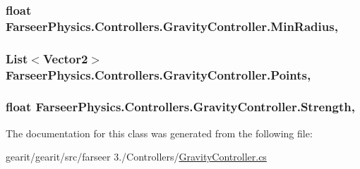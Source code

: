 \hypertarget{class_farseer_physics_1_1_controllers_1_1_gravity_controller_a62164441fdaa380f2fd9e265a9ba9fd7}{
\subsubsection[{Min\+Radius}]{\setlength{\rightskip}{0pt plus 5cm}float Farseer\+Physics.\+Controllers.\+Gravity\+Controller.\+Min\+Radius\hspace{0.3cm}{\ttfamily [get]}, {\ttfamily [set]}}}\label{class_farseer_physics_1_1_controllers_1_1_gravity_controller_a62164441fdaa380f2fd9e265a9ba9fd7}
\hypertarget{class_farseer_physics_1_1_controllers_1_1_gravity_controller_a9b05fca86103e44d8da49ab878a8d34a}{
\subsubsection[{Points}]{\setlength{\rightskip}{0pt plus 5cm}List$<$Vector2$>$ Farseer\+Physics.\+Controllers.\+Gravity\+Controller.\+Points\hspace{0.3cm}{\ttfamily [get]}, {\ttfamily [set]}}}\label{class_farseer_physics_1_1_controllers_1_1_gravity_controller_a9b05fca86103e44d8da49ab878a8d34a}
\hypertarget{class_farseer_physics_1_1_controllers_1_1_gravity_controller_a3aa01b0a64edcc24946b621b71f9a6e2}{
\subsubsection[{Strength}]{\setlength{\rightskip}{0pt plus 5cm}float Farseer\+Physics.\+Controllers.\+Gravity\+Controller.\+Strength\hspace{0.3cm}{\ttfamily [get]}, {\ttfamily [set]}}}\label{class_farseer_physics_1_1_controllers_1_1_gravity_controller_a3aa01b0a64edcc24946b621b71f9a6e2}


The documentation for this class was generated from the following file\+:\begin{DoxyCompactItemize}
\item 
gearit/gearit/src/farseer 3./\+Controllers/\hyperlink{_gravity_controller_8cs}{Gravity\+Controller.\+cs}\end{DoxyCompactItemize}
